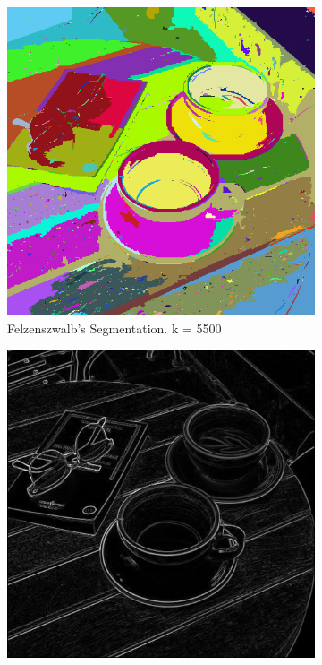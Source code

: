 \documentclass{sbc2023}
\begin{document}
\begin{figure}[H]
\begin{subfigure}[b]{0.15\textwidth}
            \includegraphics[width=\textwidth]{imgs/coffe-tableGray_felzenszwalb.png}
            \caption{Felzenszwalb's Segmentation. k = 5500}
            \label{fig:coffe_felzenszwalb}
        \end{subfigure}
    \hfill
        \begin{subfigure}[b]{0.16\textwidth}
            \includegraphics[width=\textwidth]{imgs/coffe-tableGray_gradient.png}

\end{subfigure}
\end{figure}
\end{document}
